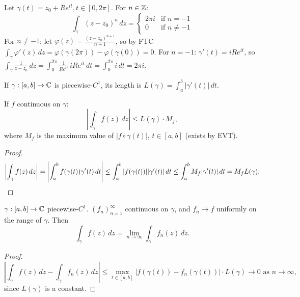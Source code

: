 \documentclass[11pt]{article}
\begin{document}
\begin{example}
Let $\gamma(t) = z_0 + R e^{it}, t \in [0, 2\pi]$.
For $n \in {\mathbb{Z}}$:
\[
\int_\gamma (z - z_0)^n \, dz = \begin{cases} 2\pi i & \text{if } n = -1 \\ 0 & \text{if } n \neq -1 \end{cases}
\]
For $n \neq -1$: let $\varphi(z) = \frac{(z-z_0)^{n+1}}{n+1}$, so by FTC $\int_\gamma \varphi'(z)\,dz = \varphi(\gamma(2\pi)) - \varphi(\gamma(0)) = 0$.
For $n=-1$: $\gamma'(t) = iRe^{it}$, so $\int_\gamma \frac{1}{z-z_0}\,dz = \int_0^{2\pi} \frac{1}{Re^{it}}\,iRe^{it}\,dt = \int_0^{2\pi} i\,dt = 2\pi i$.
\end{example}

\begin{definition}
If $\gamma:[a,b]\to{\mathbb{C}}$ is piecewise-$C^1$, its length is $L(\gamma) = \int_a^b |\gamma'(t)|\,dt$.
\end{definition}

\begin{theorem}
If $f$ continuous on $\gamma$:
\[
\left|\int_\gamma f(z)\,dz\right| \le L(\gamma)\cdot M_f,
\]
where $M_f$ is the maximum value of $|f\circ\gamma(t)|$, $t\in[a,b]$ (exists by EVT).
\end{theorem}
\begin{proof}
\[
\left|\int_\gamma f(z)\,dz\right| = \left|\int_a^b f(\gamma(t))\gamma'(t)\,dt\right| \le \int_a^b |f(\gamma(t))||\gamma'(t)|\,dt \le \int_a^b M_f|\gamma'(t)|\,dt = M_fL(\gamma). \qedhere
\]
\end{proof}

\begin{theorem}
$\gamma:[a,b]\to{\mathbb{C}}$ piecewise-$C^1$. $(f_n)_{n=1}^\infty$ continuous on $\gamma$, and $f_n \to f$ uniformly on the range of $\gamma$. Then
\[
\int_\gamma f(z)\,dz = \lim_{n\to\infty} \int_\gamma f_n(z)\,dz.
\]
\end{theorem}
\begin{proof}
\[
\left|\int_\gamma f(z)\,dz - \int_\gamma f_n(z)\,dz\right| \le \max_{t\in[a,b]} |f(\gamma(t))-f_n(\gamma(t))|\cdot L(\gamma) \to 0 \text{ as } n\to\infty,
\]
since $L(\gamma)$ is a constant.
\end{proof}
\end{document}
